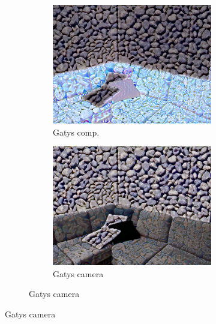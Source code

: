 \begin{figure}[]
\begin{subfigure}{\textwidth}
\begin{subfigure}{0.24\textwidth}
            \includegraphics[width=\textwidth]{images/04-experiment02/sofa/pebbles/gatys_im.jpg}
            \caption*{Gatys comp.}
        \end{subfigure}
        \hfill
        \begin{subfigure}{0.24\textwidth}
            \centering
            \includegraphics[width=\textwidth]{images/04-experiment02/sofa/pebbles/gatys_proj.jpg}
            \caption*{Gatys camera}
        \end{subfigure}
        

\end{subfigure}
\end{figure}
